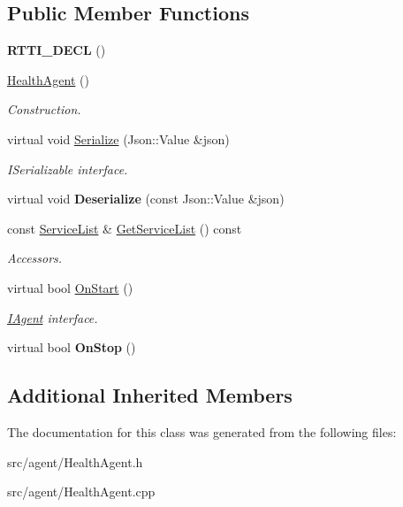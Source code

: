 \subsection*{Public Member Functions}
\begin{DoxyCompactItemize}
\item 
\mbox{\label{class_health_agent_a3b00516133f9594925129f304cbc6ae3}} 
{\bfseries R\+T\+T\+I\+\_\+\+D\+E\+CL} ()
\item 
\mbox{\label{class_health_agent_a794d05561095d15dd471e4bf7da1f954}} 
\hyperlink{class_health_agent_a794d05561095d15dd471e4bf7da1f954}{Health\+Agent} ()
\begin{DoxyCompactList}\small\item\em Construction. \end{DoxyCompactList}\item 
\mbox{\label{class_health_agent_aa2d45c6a225b9d88ad8f345d2f3cf706}} 
virtual void \hyperlink{class_health_agent_aa2d45c6a225b9d88ad8f345d2f3cf706}{Serialize} (Json\+::\+Value \&json)
\begin{DoxyCompactList}\small\item\em I\+Serializable interface. \end{DoxyCompactList}\item 
\mbox{\label{class_health_agent_afef46c76efc6894a2ab08b95fe19a58f}} 
virtual void {\bfseries Deserialize} (const Json\+::\+Value \&json)
\item 
\mbox{\label{class_health_agent_a5edb228f18d6a14468f56f72ef2793bd}} 
const \hyperlink{class_health_agent_a8803414685f25e3c0985bbdcc21bb4e5}{Service\+List} \& \hyperlink{class_health_agent_a5edb228f18d6a14468f56f72ef2793bd}{Get\+Service\+List} () const
\begin{DoxyCompactList}\small\item\em Accessors. \end{DoxyCompactList}\item 
\mbox{\label{class_health_agent_a779c622e35b2314f8a7fa4d73ae7f375}} 
virtual bool \hyperlink{class_health_agent_a779c622e35b2314f8a7fa4d73ae7f375}{On\+Start} ()
\begin{DoxyCompactList}\small\item\em \hyperlink{class_i_agent}{I\+Agent} interface. \end{DoxyCompactList}\item 
\mbox{\label{class_health_agent_a6d1f4008811c83f2ed431d957ee80019}} 
virtual bool {\bfseries On\+Stop} ()
\end{DoxyCompactItemize}
\subsection*{Additional Inherited Members}


The documentation for this class was generated from the following files\+:\begin{DoxyCompactItemize}
\item 
src/agent/Health\+Agent.\+h\item 
src/agent/Health\+Agent.\+cpp\end{DoxyCompactItemize}
